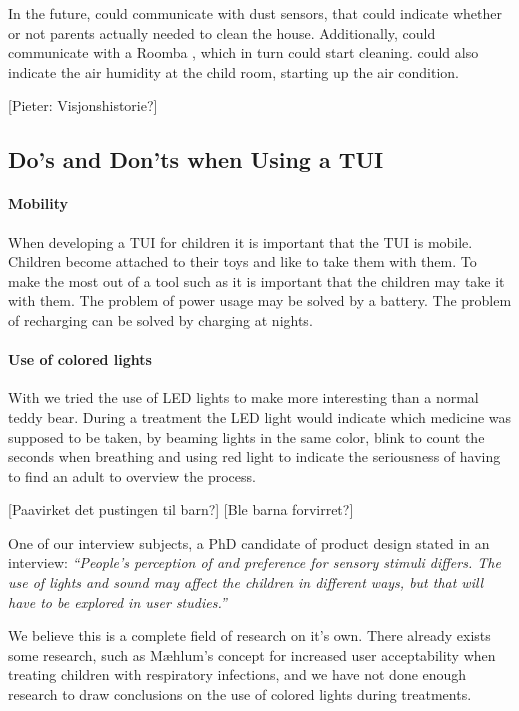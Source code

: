 In the future, \buddy{} could communicate with dust sensors, that could indicate whether or not parents actually needed to clean the house. Additionally, \buddy{} could communicate with a Roomba , which in turn could start cleaning. \buddy{} could also indicate the air humidity at the child room, starting up the air condition.   

[Pieter: Visjonshistorie?]

\subsection{Do's and Don'ts when Using a TUI}

\paragraph{Mobility}
When developing a TUI for children it is important that the TUI is mobile. Children become attached to their toys and like to take them with them. To make the most out of a tool such as \buddy{} it is important that the children may take it with them. The problem of power usage may be solved by a battery. The problem of recharging can be solved by charging at nights. 

\paragraph{Use of colored lights}
With \buddy{} we tried the use of LED lights to make \buddy{} more interesting than a normal teddy bear. During a treatment the LED light would indicate which medicine was supposed to be taken, by beaming lights in the same color, blink to count the seconds when breathing and using red light to indicate the seriousness of having to find an adult to overview the process. 

[Paavirket det pustingen til barn?]
[Ble barna forvirret?]

One of our interview subjects, a PhD candidate of product design stated in an interview: 
\textit{``People's perception of and preference for sensory stimuli differs. The use of lights and sound may affect the children in different ways, but that will have to be explored in user studies.''} 

We believe this is a complete field of research on it's own. There already exists some research, such as M\ae hlum's concept for increased user acceptability when treating children with respiratory infections\cite{mahlum2013}, and we have not done enough research to draw conclusions on the use of colored lights during treatments. 


